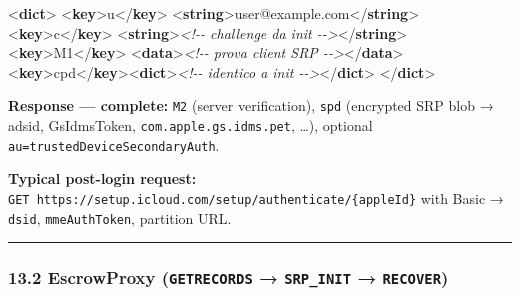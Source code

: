 \documentclass[
  english,
  10pt]{article}
\newenvironment{Shaded}{}{}
\newcommand{\CommentTok}[1]{\textcolor[rgb]{0.38,0.63,0.69}{\textit{#1}}}
\newcommand{\KeywordTok}[1]{\textcolor[rgb]{0.00,0.44,0.13}{\textbf{#1}}}
\newcommand{\NormalTok}[1]{#1}
\begin{document}
\begin{Shaded}
\begin{Highlighting}[]
\NormalTok{\textless{}}\KeywordTok{dict}\NormalTok{\textgreater{}}
\NormalTok{  \textless{}}\KeywordTok{key}\NormalTok{\textgreater{}u\textless{}/}\KeywordTok{key}\NormalTok{\textgreater{}  \textless{}}\KeywordTok{string}\NormalTok{\textgreater{}user@example.com\textless{}/}\KeywordTok{string}\NormalTok{\textgreater{}}
\NormalTok{  \textless{}}\KeywordTok{key}\NormalTok{\textgreater{}c\textless{}/}\KeywordTok{key}\NormalTok{\textgreater{}  \textless{}}\KeywordTok{string}\NormalTok{\textgreater{}}\CommentTok{\textless{}!{-}{-} challenge da init {-}{-}\textgreater{}}\NormalTok{\textless{}/}\KeywordTok{string}\NormalTok{\textgreater{}}
\NormalTok{  \textless{}}\KeywordTok{key}\NormalTok{\textgreater{}M1\textless{}/}\KeywordTok{key}\NormalTok{\textgreater{} \textless{}}\KeywordTok{data}\NormalTok{\textgreater{}}\CommentTok{\textless{}!{-}{-} prova client SRP {-}{-}\textgreater{}}\NormalTok{\textless{}/}\KeywordTok{data}\NormalTok{\textgreater{}}
\NormalTok{  \textless{}}\KeywordTok{key}\NormalTok{\textgreater{}cpd\textless{}/}\KeywordTok{key}\NormalTok{\textgreater{}\textless{}}\KeywordTok{dict}\NormalTok{\textgreater{}}\CommentTok{\textless{}!{-}{-} identico a init {-}{-}\textgreater{}}\NormalTok{\textless{}/}\KeywordTok{dict}\NormalTok{\textgreater{}}
\NormalTok{\textless{}/}\KeywordTok{dict}\NormalTok{\textgreater{}}
\end{Highlighting}
\end{Shaded}

\textbf{Response --- complete:} \texttt{M2} (server verification),
\texttt{spd} (encrypted SRP blob → adsid, GsIdmsToken,
\texttt{com.apple.gs.idms.pet}, \ldots), optional
\texttt{au=trustedDeviceSecondaryAuth}.

\textbf{Typical post-login request:}
\texttt{GET\ https://setup.icloud.com/setup/authenticate/\{appleId\}}
with Basic → \texttt{dsid}, \texttt{mmeAuthToken}, partition URL.

\begin{center}\rule{0.5\linewidth}{0.5pt}\end{center}

\subsubsection{\texorpdfstring{13.2 EscrowProxy (\texttt{GETRECORDS} →
\texttt{SRP\_INIT} →
\texttt{RECOVER})}{13.2 EscrowProxy (GETRECORDS → SRP\_INIT → RECOVER)}}\label{escrowproxy-getrecords-srp_init-recover}
\end{document}

